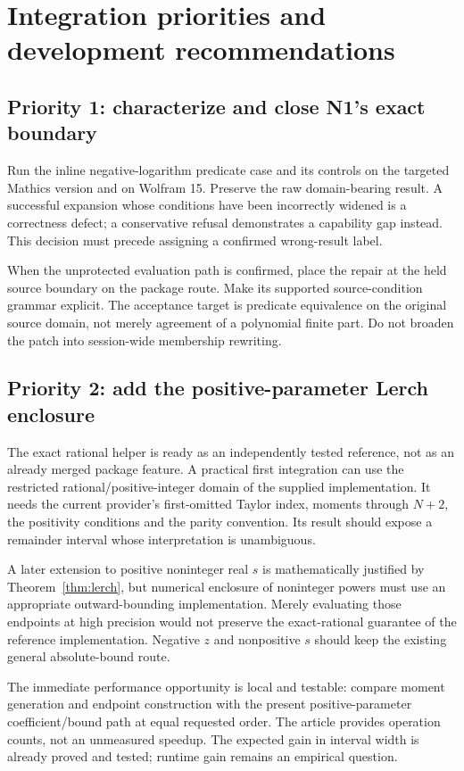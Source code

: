\documentclass[11pt,a4paper]{article}
\begin{document}
\section{Integration priorities and development recommendations}\label{sec:adoption}

\subsection{Priority 1: characterize and close N1's exact boundary}
Run the inline negative-logarithm predicate case and its controls on the targeted Mathics version and on Wolfram 15. Preserve the raw domain-bearing result. A successful expansion whose conditions have been incorrectly widened is a correctness defect; a conservative refusal demonstrates a capability gap instead. This decision must precede assigning a confirmed wrong-result label.

When the unprotected evaluation path is confirmed, place the repair at the held source boundary on the package route. Make its supported source-condition grammar explicit. The acceptance target is predicate equivalence on the original source domain, not merely agreement of a polynomial finite part. Do not broaden the patch into session-wide membership rewriting.

\subsection{Priority 2: add the positive-parameter Lerch enclosure}
The exact rational helper is ready as an independently tested reference, not as an already merged package feature. A practical first integration can use the restricted rational/positive-integer domain of the supplied implementation. It needs the current provider's first-omitted Taylor index, moments through $N+2$, the positivity conditions and the parity convention. Its result should expose a remainder interval whose interpretation is unambiguous.

A later extension to positive noninteger real $s$ is mathematically justified by Theorem~\ref{thm:lerch}, but numerical enclosure of noninteger powers must use an appropriate outward-bounding implementation. Merely evaluating those endpoints at high precision would not preserve the exact-rational guarantee of the reference implementation. Negative $z$ and nonpositive $s$ should keep the existing general absolute-bound route.

The immediate performance opportunity is local and testable: compare moment generation and endpoint construction with the present positive-parameter coefficient/bound path at equal requested order. The article provides operation counts, not an unmeasured speedup. The expected gain in interval width is already proved and tested; runtime gain remains an empirical question.
\end{document}
